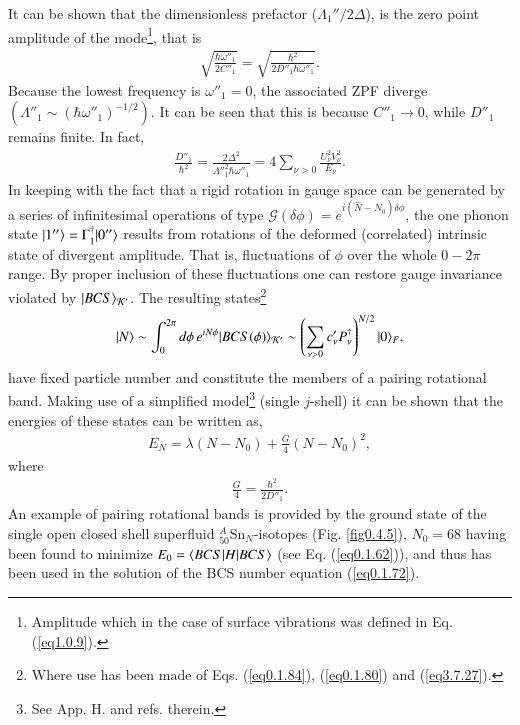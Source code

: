 It can be shown that the dimensionless prefactor ($\Lambda_1''/2\Delta$), is the zero point amplitude of the mode\footnote{Amplitude which in the case of surface vibrations was defined in Eq. (\ref{eq1.0.9}).}, that is 
\begin{align}\label{eq0.1.99}
\sqrt{\frac{\hbar\omega''_1}{2C''_1}}=\sqrt{\frac{\hbar^2}{2D''_1\hbar\omega''_1}}.
\end{align}
Because the lowest frequency is $\omega''_1=0$, the associated ZPF diverge $(\Lambda''_1\sim(\hbar\omega''_1)^{-1/2})$. It can be seen that this is because $C''_1\to0$, while $D''_1$ remains finite. In fact,
\begin{align}\label{eq0.1.100}
\frac{D''_1}{\hbar^2}=\frac{2\Delta^2}{\Lambda''^2_1\hbar\omega''_1}=4\sum_{\nu>0}\frac{U^2_\nu V^2_\nu}{E_\nu}.
\end{align}
 In keeping with the fact that a rigid rotation in gauge space can be generated by a series of infinitesimal operations of type $\mathcal G(\delta\phi)=e^{i(\hat N-N_0)\delta\phi}$, the one phonon state $|{1''} \rangle=\Gamma^\dagger_1|{0''} \rangle$ results from rotations of the deformed (correlated) intrinsic state of divergent amplitude. That is, fluctuations of $\phi$ over the whole $0-2\pi$ range. By proper inclusion of these fluctuations one can restore gauge invariance violated by $|{BCS} \rangle_{\mathcal K'}$. The resulting states\footnote{Where use has been made of Eqs. (\ref{eq0.1.84}), (\ref{eq0.1.80}) and (\ref{eq3.7.27}).}
\begin{align}\label{eq0.1.101}
|{N} \rangle\sim\int^{2\pi}_0d\phi\,e^{iN\phi}|{BCS(\phi)} \rangle_{\mathcal K'}\sim\left(\sum_{\nu>0}c'_\nu P^\dagger_\nu\right)^{N/2}|{0} \rangle_F,
\end{align}
have  fixed  particle number and constitute the members of a pairing rotational band. Making use of a simplified model\footnote{See \cite{Brink:05} App. H. and refs. therein.} (single $j$-shell) it can be shown that the energies of these states can be written as,
\begin{align}\label{eq0.1.102}
E_N=\lambda(N-N_0)+\frac{G}{4}\left(N-N_0\right)^2,
\end{align}
where 
\begin{align}\label{eq0.1.103}
\frac{G}{4}=\frac{\hbar^2}{2D''_1}.
\end{align}
An example of pairing rotational bands is provided by the ground state of the single open closed shell superfluid  $^A_{50}$Sn$_N$-isotopes (Fig. \ref{fig0.4.5}), $N_0=68$ having been found to minimize $E_0=\langle {BCS|H|BCS} \rangle$ (see Eq. (\ref{eq0.1.62})), and thus has been used in the solution of the BCS number equation (\ref{eq0.1.72}). 



